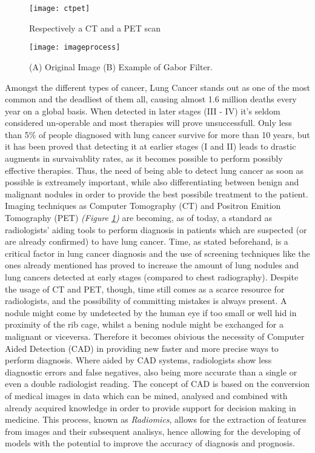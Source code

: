 \documentclass[../main.tex]{subfiles}
\begin{document}
\label{stateofart}
\thispagestyle{empty}

\begin{figure}[b]
\caption{Respectively a CT and a PET scan}
\centering
\texttt{[image: ctpet]}
\label{ctpet}
\end{figure}

\begin{figure}[b]
\caption{(A) Original Image (B) Example of Gabor Filter. \cite{Chaudhary2012}}
\centering
\texttt{[image: imageprocess]}
\label{imageprocess}
\end{figure}

Amongst the different types of cancer, Lung Cancer stands out as one of the most common and the deadliest of them all, causing almost 1.6 million deaths every year on a global basis.\cite{Wasserman2015} When detected in later stages (III - IV) it's seldom considered un-operable and most therapies will prove unsuccessfull. Only less than 5\% of people diagnosed with lung cancer survive for more than 10 years, but it has been proved that detecting it at earlier stages (I and II) leads to drastic augments in survaivablity rates,\cite{CancerResearchUK} as it becomes possible to perform possibly effective therapies. Thus, the need of being able to detect lung cancer as soon as possible is extreamely important, while also differentiating between benign and malignant nodules in order to provide the best possibile treatment to the patient. Imaging techniques as Computer Tomography (CT) and Positron Emition Tomography (PET) \textit{(Figure \ref{ctpet})} are becoming, as of today, a standard as radiologists' aiding tools to perform diagnosis in patients which are suspected (or are already confirmed) to have lung cancer.\cite{Indicators2017} Time, as stated beforehand, is a critical factor in lung cancer diagnosis and the use of screening techniques like the ones already mentioned has proved to increase the amount of lung nodules and lung cancers detected at early stages (compared to chest radiography).\cite{AlMohammad2017} Despite the usage of CT and PET, though, time still comes as a scarce resource for radiologists, and the possibility of committing mistakes is always present. A nodule might come by undetected by the human eye if too small or well hid in proximity of the rib cage, whilst a bening nodule might be exchanged for a malignant or viceversa. Therefore it becomes obivious the necessity of Computer Aided Detection (CAD) in providing new faster and more precise ways to perform diagnosis. Where aided by CAD systems, radiologists show less diagnostic errors and false negatives, also being more accurate than a single or even a double radiologist reading.\cite{AlMohammad2017} The concept of CAD is based on the conversion of medical images in data which can be mined, analysed and combined with already acquired knowledge in order to provide support for decision making in medicine. This process, known as \textit{Radiomics}, allows for the extraction of features from images and their subsequent analisys, hence allowing for the developing of models with the potential to improve the accuracy of diagnosis and prognosis.\cite{Gillies2016} 
\vspace{5mm}
\end{document}
